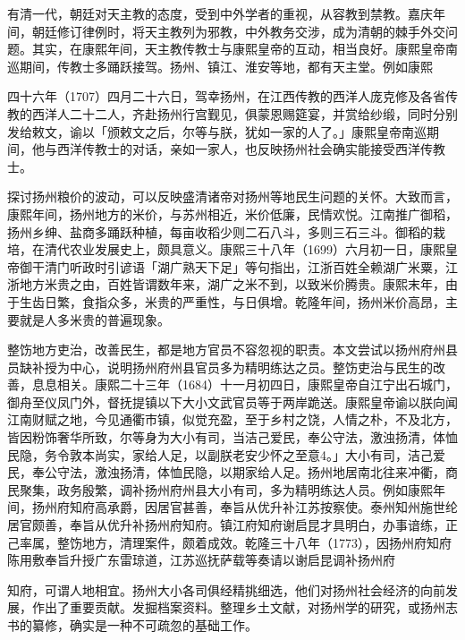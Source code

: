 有清一代，朝廷对天主教的态度，受到中外学者的重视，从容教到禁教。嘉庆年间，朝廷修订律例时，将天主教列为邪教，中外教务交涉，成为清朝的棘手外交问题。其实，在康熙年间，天主教传教士与康熙皇帝的互动，相当良好。康熙皇帝南巡期间，传教士多踊跃接驾。扬州、镇江、淮安等地，都有天主堂。例如康熙


\noindent 四十六年（1707）四月二十六日，驾幸扬州，在江西传教的西洋人庞克修及各省传教的西洋人二十二人，齐赴扬州行宫觐见，俱蒙恩赐筵宴，并赏给纱缎，同时分别发给敕文，谕以「颁敕文之后，尔等与朕，犹如一家的人了。」康熙皇帝南巡期间，他与西洋传教士的对话，亲如一家人，也反映扬州社会确实能接受西洋传教士。

探讨扬州粮价的波动，可以反映盛清诸帝对扬州等地民生问题的关怀。大致而言，康熙年间，扬州地方的米价，与苏州相近，米价低廉，民情欢悦。江南推广御稻，扬州乡绅、盐商多踊跃种植，每亩收稻少则二石八斗，多则三石三斗。御稻的栽培，在清代农业发展史上，颇具意义。康熙三十八年（1699）六月初一日，康熙皇帝御干清门听政时引谚语「湖广熟天下足」等句指出，江浙百姓全赖湖广米粟，江浙地方米贵之由，百姓皆谓数年来，湖广之米不到，以致米价腾贵。康熙末年，由于生齿日繁，食指众多，米贵的严重性，与日俱增。乾隆年间，扬州米价高昂，主要就是人多米贵的普遍现象。

整饬地方吏治，改善民生，都是地方官员不容忽视的职责。本文尝试以扬州府州县员缺补授为中心，说明扬州府州县官员多为精明练达之员。整饬吏治与民生的改善，息息相关。康熙二十三年（1684）十一月初四日，康熙皇帝自江宁出石城门，御舟至仪凤门外，督抚提镇以下大小文武官员等于两岸跪送。康熙皇帝谕以朕向闻江南财赋之地，今见通衢市镇，似觉充盈，至于乡村之饶，人情之朴，不及北方，皆因粉饰奢华所致，尔等身为大小有司，当洁己爱民，奉公守法，激浊扬清，体恤民隐，务令敦本尚实，家给人足，以副朕老安少怀之至意4。」大小有司，洁己爱民，奉公守法，激浊扬清，体恤民隐，以期家给人足。扬州地居南北往来冲衢，商民聚集，政务殷繁，调补扬州府州县大小有司，多为精明练达人员。例如康熙年间，扬州府知府高承爵，因居官甚善，奉旨从优升补江苏按察使。泰州知州施世纶居官颇善，奉旨从优升补扬州府知府。镇江府知府谢启昆才具明白，办事谙练，正己率属，整饬地方，清理案件，颇着成效。乾隆三十八年（1773），因扬州府知府陈用敷奉旨升授广东雷琼道，江苏巡抚萨载等奏请以谢启昆调补扬州府

\vfill
\begin{BookNotes}
\end{BookNotes}

\noindent 知府，可谓人地相宜。扬州大小各司俱经精挑细选，他们对扬州社会经济的向前发展，作出了重要贡献。发掘档案资料。整理乡土文献，对扬州学的研究，或扬州志书的纂修，确实是一种不可疏忽的基础工作。


